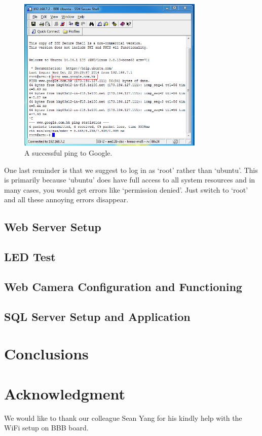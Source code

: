 \documentclass[12pt,journal,draftclsnofoot,onecolumn]{IEEEtran}
\begin{document}
\begin{figure}[htb]
	\centering
	\includegraphics[width=3.5in]{./figs/ping.PNG}
	\caption{A successful ping to Google.}
	\label{ping}
\end{figure}

One last reminder is that we suggest to log in as `root' rather than `ubuntu'. This is primarily because `ubuntu' does have full access to all system resources and in many cases, you would get errors like `permission denied'. Just switch to `root' and all these annoying errors disappear.

\subsection{Web Server Setup}\label{Webser}
	
\subsection{LED Test}\label{Led}
	
\subsection{Web Camera Configuration and Functioning}\label{Webcam}

\subsection{SQL Server Setup and Application}\label{Sql}
	
\section{Conclusions}\label{Con}

\section*{Acknowledgment}
We would like to thank our colleague Sean Yang  for his kindly help with the WiFi setup on BBB board.




\end{document}
